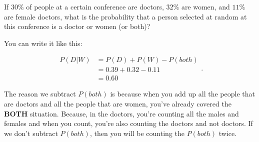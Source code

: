 
If $30\%$ of people at a certain conference are doctors, $32\%$ are women, and
$11\%$ are female doctors, what is the probability that a person selected at
random at this conference is a doctor or women (or both)?

You can write it like this:

\begin{equation}
  \label{eqt:probaility_of_intersection_or_union}
  \begin{split}
    P(D | W) &= P(D) + P(W) - P(both) \\
             &= 0.39 + 0.32 - 0.11 \\
             &= 0.60
  \end{split}
.\end{equation}

The reason we subtract $P(both)$ is because when you add up all the people that
are doctors and all the people that are women, you've already covered the
\textbf{BOTH} situation. Because, in the doctors, you're counting all the males
and females and when you count, you're also counting the doctors and not
doctors. If we don't subtract $P(both)$, then you will be counting the $P(both)$
twice.

\newpage
